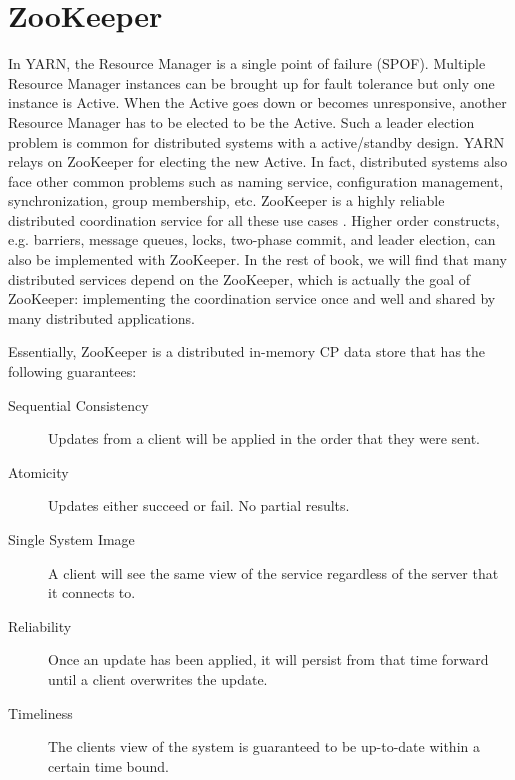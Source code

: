 \documentclass[11pt]{book}
\begin{document}
\section[ZooKeeper]
{ZooKeeper}
In YARN, the Resource Manager is a single point of failure (SPOF). Multiple Resource Manager instances can be brought up for fault tolerance but only one instance is Active. 
When the Active goes down or becomes unresponsive, another Resource Manager has to be elected to be the Active. Such a leader election problem is common for distributed systems with a active/standby design. YARN relays on ZooKeeper for electing the new Active. In fact, distributed systems also face other common problems such as naming service, configuration management, synchronization, group membership, etc. ZooKeeper is a highly reliable distributed coordination service for all these use cases \cite{ZooKeeper}. Higher order constructs, e.g. barriers, message queues, locks, two-phase commit, and leader election, can also be implemented with ZooKeeper. In the rest of book, we will find that many distributed services depend on the ZooKeeper, which is actually the goal of ZooKeeper: implementing the coordination service once and well and shared by many distributed applications.

Essentially, ZooKeeper is a distributed in-memory CP data store that has the following guarantees:
\begin{description}
\item[Sequential Consistency] Updates from a client will be applied in the order that they were sent.
\item[Atomicity] Updates either succeed or fail. No partial results.
\item[Single System Image] A client will see the same view of the service regardless of the server that it connects to.
\item[Reliability] Once an update has been applied, it will persist from that time forward until a client overwrites the update.
\item[Timeliness] The clients view of the system is guaranteed to be up-to-date within a certain time bound.
\end{description}
\end{document}
